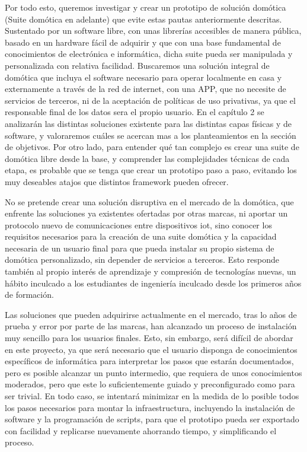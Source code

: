 \vspace{1cm}

Por todo esto, queremos investigar y crear un prototipo de solución domótica (Suite domótica en adelante) que evite estas pautas anteriormente descritas. Sustentado por un software libre, con unas librerías accesibles de manera pública, basado en un hardware fácil de adquirir y que con una base fundamental de conocimientos de electrónica e informática, dicha suite pueda ser manipulada y personalizada con relativa facilidad. Buscaremos una solución integral de domótica que incluya el software necesario para operar localmente en casa y externamente a través de la red de internet, con una APP, que no necesite de servicios de terceros, ni de la aceptación de políticas de uso privativas, ya que el responsable final de los datos sera el propio usuario. En el capítulo 2 se analizarán las distintas soluciones existente para las distintas capas físicas y de software, y valoraremos cuáles se acercan mas a los planteamientos en la  sección de objetivos. Por otro lado, para entender qué tan complejo es crear una suite de domótica libre desde la base, y comprender las complejidades técnicas de cada etapa, es probable que se tenga que crear un prototipo paso a paso, evitando los muy deseables atajos que distintos \gls{framework} pueden ofrecer.

\vspace{1cm}

No se pretende crear una solución disruptiva en el mercado de la domótica, que enfrente las soluciones ya existentes ofertadas por otras marcas, ni aportar un protocolo nuevo de comunicaciones entre dispositivos \gls{iot}, sino conocer los requisitos necesarios para la creación de una suite domótica y la capacidad necesaria de un usuario final para que pueda instalar su propio sistema de domótica personalizado, sin depender de servicios a terceros. Esto responde también al propio interés de aprendizaje y compresión de tecnologías nuevas, un hábito inculcado a los estudiantes de ingeniería inculcado desde los primeros años de formación.

\vspace{1cm}

Las soluciones que pueden adquirirse actualmente en el mercado, tras lo años de prueba y error por parte de las marcas, han alcanzado un proceso de instalación muy sencillo para los usuarios finales. Esto, sin embargo, será difícil de abordar en este proyecto, ya que será necesario que el usuario disponga de conocimientos específicos de informática para interpretar los pasos que estarán documentados, pero es posible alcanzar un punto intermedio, que requiera de unos conocimientos moderados, pero que este lo suficientemente guiado y preconfigurado como para ser trivial. En todo caso, se intentará minimizar en la medida de lo posible todos los pasos necesarios para montar la infraestructura, incluyendo la instalación de software y la programación de scripts, para que el prototipo pueda ser exportado con facilidad y replicarse nuevamente ahorrando tiempo, y simplificando el proceso.

